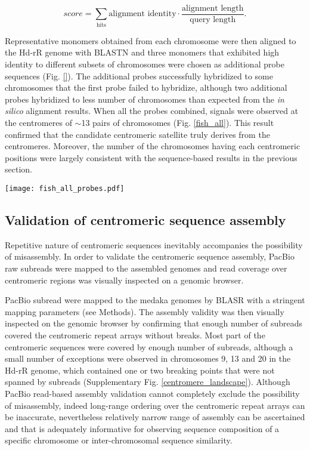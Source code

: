  \[
    score = \sum_{\mbox{hits}} \mbox{alignment identity} \cdot \frac{\mbox{alignment length}}{\mbox{query length}}.
  \]

  Representative monomers obtained from each chromosome were then aligned to the Hd-rR genome with BLASTN and three monomers that exhibited high identity to different subsets of chromosomes were chosen as additional probe sequences (Fig. \ref{}). The additional probes successfully hybridized to some chromosomes that the first probe failed to hybridize, although two additional probes hybridized to less number of chromosomes than expected from the \textit{in silico} alignment results. When all the probes combined, signals were observed at the centromeres of $\sim$13 pairs of chromosomes (Fig. \ref{fish_all}). This result confirmed that the candidate centromeric satellite truly derives from the centromeres. Moreover, the number of the chromosomes having each centromeric positions were largely consistent with the sequence-based results in the previous section.

  \begin{figure*}
    \centering
    \texttt{[image: fish\_all\_probes.pdf]}
    \caption{
      The candidate centromeric satellite sequence and three derivative sequences localized to the centromeres of $\sim$13 pairs of chromosomes. (left) DNA is stained with DAPI. (center) probes are stained green. (right) two images are combined.
    }
    \label{fish_all}
  \end{figure*}


\subsection*{Validation of centromeric sequence assembly}
  Repetitive nature of centromeric sequences inevitably accompanies the possibility of misassembly. In order to validate the centromeric sequence assembly, PacBio raw subreads were mapped to the assembled genomes and read coverage over centromeric regions was visually inspected on a genomic browser.

  PacBio subread were mapped to the medaka genomes by BLASR \cite{Chaisson2012} with a stringent mapping parameters (see Methods). The assembly validity was then visually inspected on the genomic browser by confirming that enough number of subreads covered the centromeric repeat arrays without breaks. Most part of the centromeric sequences were covered by enough number of subreads, although a small number of exceptions were observed in chromosomes 9, 13 and 20 in the Hd-rR genome, which contained one or two breaking points that were not spanned by subreads (Supplementary Fig. \ref{centromere_landscape}). Although PacBio read-based assembly validation cannot completely exclude the possibility of misassembly, indeed long-range ordering over the centromeric repeat arrays can be inaccurate, nevertheless relatively narrow range of assembly can be ascertained and that is adequately informative for observing sequence composition of a specific chromosome or inter-chromosomal sequence similarity.


